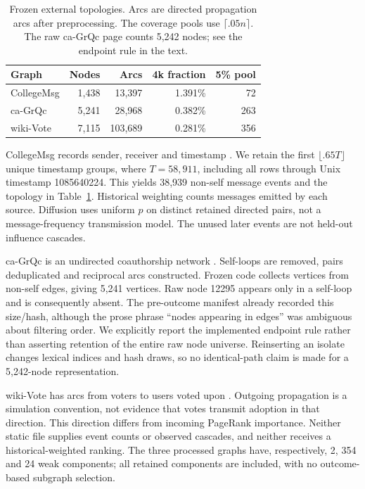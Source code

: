 \documentclass[smallextended]{svjour3}
\begin{document}
\begin{table}[htbp]
\caption{Frozen external topologies. Arcs are directed propagation arcs after preprocessing. The coverage pools use $\lceil .05n\rceil$. The raw ca-GrQc page counts 5,242 nodes; see the endpoint rule in the text.}\label{tab:data}
\begin{tabular}{lrrrr}
\toprule
Graph & Nodes & Arcs & 4k fraction & 5\% pool \\
\midrule
CollegeMsg & 1,438 & 13,397 & 1.391\% & 72 \\
ca-GrQc & 5,241 & 28,968 & 0.382\% & 263 \\
wiki-Vote & 7,115 & 103,689 & 0.281\% & 356 \\
\bottomrule
\end{tabular}
\end{table}

CollegeMsg records sender, receiver and timestamp \cite{college}. We retain the first $\lfloor .65T\rfloor$ unique timestamp groups, where $T=58,911$, including all rows through Unix timestamp 1085640224. This yields 38,939 non-self message events and the topology in Table~\ref{tab:data}. Historical weighting counts messages emitted by each source. Diffusion uses uniform $p$ on distinct retained directed pairs, not a message-frequency transmission model. The unused later events are not held-out influence cascades.

ca-GrQc is an undirected coauthorship network \cite{grqc}. Self-loops are removed, pairs deduplicated and reciprocal arcs constructed. Frozen code collects vertices from non-self edges, giving 5,241 vertices. Raw node 12295 appears only in a self-loop and is consequently absent. The pre-outcome manifest already recorded this size/hash, although the prose phrase ``nodes appearing in edges'' was ambiguous about filtering order. We explicitly report the implemented endpoint rule rather than asserting retention of the entire raw node universe. Reinserting an isolate changes lexical indices and hash draws, so no identical-path claim is made for a 5,242-node representation.

wiki-Vote has arcs from voters to users voted upon \cite{signed,links}. Outgoing propagation is a simulation convention, not evidence that votes transmit adoption in that direction. This direction differs from incoming PageRank importance. Neither static file supplies event counts or observed cascades, and neither receives a historical-weighted ranking. The three processed graphs have, respectively, 2, 354 and 24 weak components; all retained components are included, with no outcome-based subgraph selection.
\end{document}
